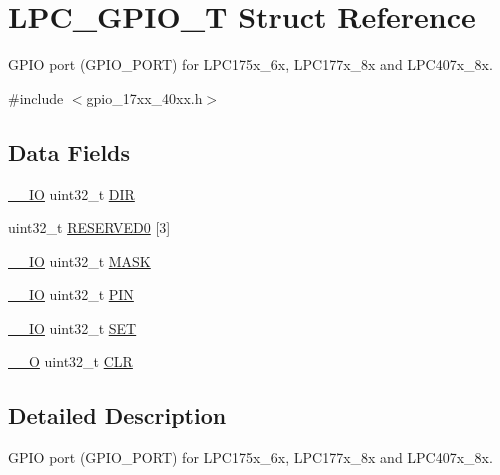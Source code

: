 \hypertarget{structLPC__GPIO__T}{\section{L\-P\-C\-\_\-\-G\-P\-I\-O\-\_\-\-T Struct Reference}
\label{structLPC__GPIO__T}
}


G\-P\-I\-O port (G\-P\-I\-O\-\_\-\-P\-O\-R\-T) for L\-P\-C175x\-\_\-6x, L\-P\-C177x\-\_\-8x and L\-P\-C407x\-\_\-8x.  




{\ttfamily \#include $<$gpio\-\_\-17xx\-\_\-40xx.\-h$>$}

\subsection*{Data Fields}
\begin{DoxyCompactItemize}
\item 
\hyperlink{core__cm3_8h_aec43007d9998a0a0e01faede4133d6be}{\-\_\-\-\_\-\-I\-O} uint32\-\_\-t \hyperlink{structLPC__GPIO__T_a753957fa7e1c261e57255c1db8d62bb7}{D\-I\-R}
\item 
uint32\-\_\-t \hyperlink{structLPC__GPIO__T_a292d7fd1269aebf1bf53d6df324319a3}{R\-E\-S\-E\-R\-V\-E\-D0} \mbox{[}3\mbox{]}
\item 
\hyperlink{core__cm3_8h_aec43007d9998a0a0e01faede4133d6be}{\-\_\-\-\_\-\-I\-O} uint32\-\_\-t \hyperlink{structLPC__GPIO__T_a5b0ae096141efd7298aad95ca7b3370e}{M\-A\-S\-K}
\item 
\hyperlink{core__cm3_8h_aec43007d9998a0a0e01faede4133d6be}{\-\_\-\-\_\-\-I\-O} uint32\-\_\-t \hyperlink{structLPC__GPIO__T_a1311cc8cf63279d1bdfca5d48c6ccf0a}{P\-I\-N}
\item 
\hyperlink{core__cm3_8h_aec43007d9998a0a0e01faede4133d6be}{\-\_\-\-\_\-\-I\-O} uint32\-\_\-t \hyperlink{structLPC__GPIO__T_aaafd15e2c4eb4665f7a546dfeea25954}{S\-E\-T}
\item 
\hyperlink{core__cm3_8h_a7e25d9380f9ef903923964322e71f2f6}{\-\_\-\-\_\-\-O} uint32\-\_\-t \hyperlink{structLPC__GPIO__T_aba8161f685588a1ca79702207083e6ab}{C\-L\-R}
\end{DoxyCompactItemize}


\subsection{Detailed Description}
G\-P\-I\-O port (G\-P\-I\-O\-\_\-\-P\-O\-R\-T) for L\-P\-C175x\-\_\-6x, L\-P\-C177x\-\_\-8x and L\-P\-C407x\-\_\-8x. 

